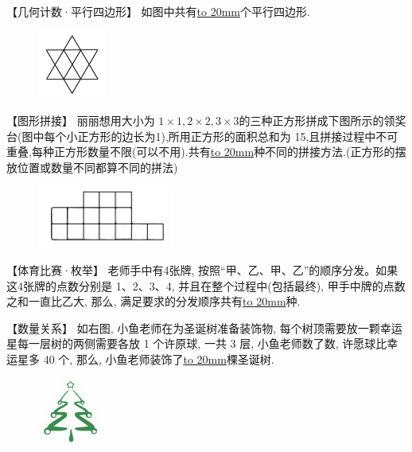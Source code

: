 \item {
    【几何计数·平行四边形】
    如图中共有\underline{\hbox to 20mm{}}个平行四边形.
    \begin{figure}[H] 
        \centering
        \includegraphics[width=0.2\textwidth]{./pics/Chapter_4/2017_1.png}
    \end{figure}
}

\item {
    【图形拼接】
    丽丽想用大小为 $1\times 1, 2\times 2, 3\times 3$的三种正方形拼成下图所示的领奖台(图中每个小正方形的边长为1),所用正方形的面积总和为 15,且拼接过程中不可重叠,每种正方形数量不限(可以不用).共有\underline{\hbox to 20mm{}}种不同的拼接方法.(正方形的摆放位置或数量不同都算不同的拼法)
    \begin{figure}[H] 
        \centering
        \includegraphics[width=0.4\textwidth]{./pics/Chapter_4/9.png}
    \end{figure}
}

\item {
    【体育比赛·枚举】
    老师手中有4张牌, 按照``甲、乙、甲、乙''的顺序分发。如果这4张牌的点数分别是 1、2、3、4, 并且在整个过程中(包括最终), 甲手中牌的点数之和一直比乙大, 那么, 满足要求的分发顺序共有\underline{\hbox to 20mm{}}种.
    \vspace{1cm}
}

\item {
    【数量关系】
    如右图, 小鱼老师在为圣诞树准备装饰物, 每个树顶需要放一颗幸运星每一层树的两侧需要各放 1 个许原球, 一共 3 层, 小鱼老师数了数, 许愿球比幸运星多 40 个, 那么, 小鱼老师装饰了\underline{\hbox to 20mm{}}棵圣诞树.
    \begin{figure}[H] 
        \centering
        \includegraphics[width=0.2\textwidth]{./pics/Chapter_4/13.png}
    \end{figure}
}

